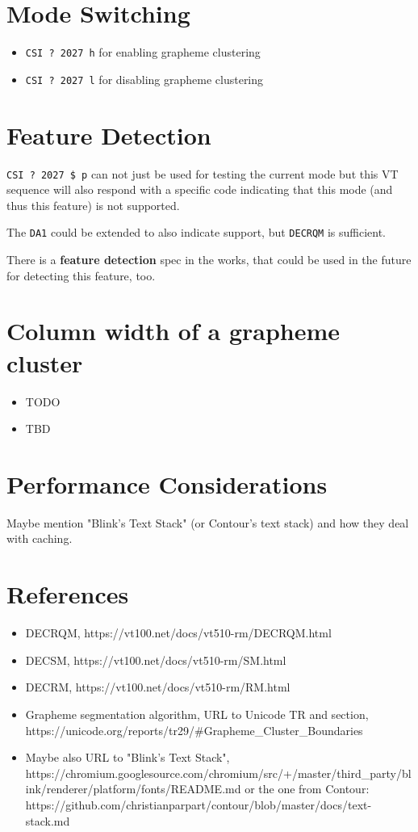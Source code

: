 \documentclass{article}
\newcommand{\code}[1]{\colorbox{light-gray}{\texttt{#1}}}
\newcommand{\DECRQM}[1]{\code{CSI ? #1 \$ p}}
\newcommand{\DECSET}[1]{\code{CSI ? #1 h}}
\newcommand{\DECRST}[1]{\code{CSI ? #1 l}}
\newcommand\VtModeNum{2027}                          %
\newcommand{\GCON}{\DECSET{\VtModeNum{}}}            %
\newcommand{\GCOFF}{\DECRST{\VtModeNum{}}}           %
\begin{document}
\section{Mode Switching}

\begin{itemize}
    \item \GCON{} for enabling grapheme clustering
    \item \GCOFF{} for disabling grapheme clustering
\end{itemize}

\section{Feature Detection}

\DECRQM{\VtModeNum} can not just be used for testing the current mode but this VT sequence will also
respond with a specific code indicating that this mode (and thus this feature) is not supported.

The \code{DA1} could be extended to also indicate support, but \code{DECRQM} is sufficient.

There is a \textbf{feature detection}  spec in the works, that could be used in the future for
detecting this feature, too.

\section{Column width of a grapheme cluster}

\begin{itemize}
    \item TODO
    \item TBD
\end{itemize}

\section{Performance Considerations}

Maybe mention "Blink's Text Stack" (or Contour's text stack) and how they deal with caching.

\section{References}

\begin{itemize}
    \item DECRQM, https://vt100.net/docs/vt510-rm/DECRQM.html
    \item DECSM, https://vt100.net/docs/vt510-rm/SM.html
    \item DECRM, https://vt100.net/docs/vt510-rm/RM.html
    \item Grapheme segmentation algorithm, URL to Unicode TR and section,
        https://unicode.org/reports/tr29/\#Grapheme\_Cluster\_Boundaries
    \item Maybe also URL to "Blink's Text Stack",
        https://chromium.googlesource.com/chromium/src/+/master/third\_party/blink/renderer/platform/fonts/README.md
        or the one from Contour:
        https://github.com/christianparpart/contour/blob/master/docs/text-stack.md
\end{itemize}
\end{document}
